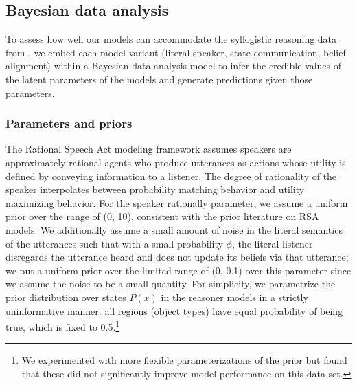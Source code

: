 \documentclass[floatsintext, doc]{apa6}
\begin{document}

%


\subsection{Bayesian data analysis}

To assess how well our models can accommodate the syllogistic reasoning data from , we embed each model variant (literal speaker, state communication, belief alignment) within a Bayesian data analysis model to infer the credible values of the latent parameters of the models and generate predictions given those parameters. 

\subsubsection{Parameters and priors}

The Rational Speech Act modeling framework assumes speakers are approximately rational agents who produce utterances as actions whose utility is defined by conveying information to a listener. The degree of rationality of the speaker interpolates between probability matching behavior and utility maximizing behavior. 
For the speaker rationally parameter, we assume a uniform prior over the range of (0, 10), consistent with the prior literature on RSA models. 
We additionally assume a small amount of noise in the literal semantics of the utterances such that with a small probability $\phi$, the literal listener disregards the utterance heard and does not update its beliefs via that utterance; we put a uniform prior over the limited range of (0, 0.1) over this parameter since we assume the noise to be a small quantity. 
For simplicity, we parametrize the prior distribution over states $P(x)$ in the reasoner models in a strictly uninformative manner: all regions (object types) have equal probability of being true, which is fixed to 0.5.\footnote{
We experimented with more flexible parameterizations of the prior but found that these did not significantly improve model performance on this data set.}
\end{document}
